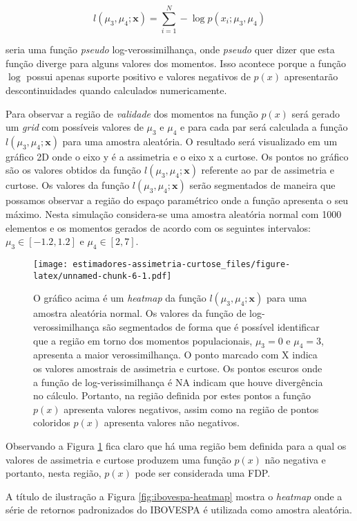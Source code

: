 \documentclass[]{article}
\begin{document}
\[
l(\mu_3, \mu_4; \mathbf{x}) = \sum_{i=1}^N - \log p(x_i; \mu_3, \mu_4)
\]

seria uma função \emph{pseudo} log-verossimilhança, onde \emph{pseudo}
quer dizer que esta função diverge para alguns valores dos momentos.
Isso acontece porque a função \(\log\) possui apenas suporte positivo e
valores negativos de \(p(x)\) apresentarão descontinuidades quando
calculados numericamente.

Para observar a região de \emph{validade} dos momentos na função
\(p(x)\) será gerado um \emph{grid} com possíveis valores de \(\mu_3\) e
\(\mu_4\) e para cada par será calculada a função
\(l(\mu_3, \mu_4; \mathbf{x})\) para uma amostra aleatória. O resultado
será visualizado em um gráfico 2D onde o eixo y é a assimetria e o eixo
x a curtose. Os pontos no gráfico são os valores obtidos da função
\(l(\mu_3, \mu_4; \mathbf{x})\) referente ao par de assimetria e
curtose. Os valores da função \(l(\mu_3, \mu_4; \mathbf{x})\) serão
segmentados de maneira que possamos observar a região do espaço
paramétrico onde a função apresenta o seu máximo. Nesta simulação
considera-se uma amostra aleatória normal com 1000 elementos e os
momentos gerados de acordo com os seguintes intervalos:
\(\mu_3 \in [-1.2, 1.2]\) e \(\mu_4 \in [2, 7]\).

\begin{figure}
\centering
\texttt{[image: estimadores-assimetria-curtose\_files/figure-latex/unnamed-chunk-6-1.pdf]}
\caption{\label{fig:random-heatmap} O gráfico acima é um
\textit{heatmap} da função \(l(\mu_3, \mu_4; \mathbf{x})\) para uma
amostra aleatória normal. Os valores da função de log-verossimilhança
são segmentados de forma que é possível identificar que a região em
torno dos momentos populacionais, \(\mu_3=0\) e \(\mu_4 = 3\), apresenta
a maior verossimilhança. O ponto marcado com X indica os valores
amostrais de assimetria e curtose. Os pontos escuros onde a função de
log-verissimilhança é NA indicam que houve divergência no cálculo.
Portanto, na região definida por estes pontos a função \(p(x)\)
apresenta valores negativos, assim como na região de pontos coloridos
\(p(x)\) apresenta valores não negativos.}
\end{figure}

Observando a Figura \ref{fig:random-heatmap} fica claro que há uma
região bem definida para a qual os valores de assimetria e curtose
produzem uma função \(p(x)\) não negativa e portanto, nesta região,
\(p(x)\) pode ser considerada uma FDP.

A título de ilustração a Figura \ref{fig:ibovespa-heatmap} mostra o
\emph{heatmap} onde a série de retornos padronizados do IBOVESPA é
utilizada como amostra aleatória.
\end{document}
